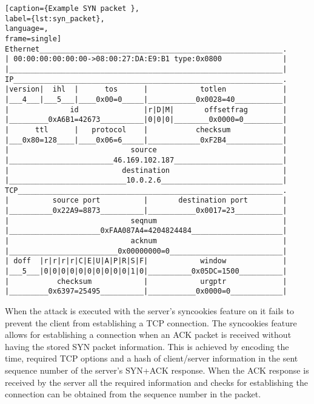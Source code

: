 \begin{minipage}{\linewidth}
\begin{lstlisting}[caption={Example SYN packet },
label={lst:syn_packet},
language=,
frame=single]
Ethernet________________________________________________________.
| 00:00:00:00:00:00->08:00:27:DA:E9:B1 type:0x0800              |
|_______________________________________________________________|
IP______________________________________________________________.
|version|  ihl  |      tos      |            totlen             |
|___4___|___5___|____0x00=0_____|___________0x0028=40___________|
|              id               |r|D|M|       offsetfrag        |
|_________0xA6B1=42673__________|0|0|0|________0x0000=0_________|
|      ttl      |   protocol    |           checksum            |
|___0x80=128____|____0x06=6_____|____________0xF2B4_____________|
|                            source                             |
|________________________46.169.102.187_________________________|
|                          destination                          |
|___________________________10.0.2.6____________________________|
TCP_____________________________________________________________.
|          source port          |       destination port        |
|__________0x22A9=8873__________|___________0x0017=23___________|
|                            seqnum                             |
|_____________________0xFAA087A4=4204824484_____________________|
|                            acknum                             |
|_________________________0x00000000=0__________________________|
| doff  |r|r|r|r|C|E|U|A|P|R|S|F|            window             |
|___5___|0|0|0|0|0|0|0|0|0|0|1|0|__________0x05DC=1500__________|
|           checksum            |            urgptr             |
|_________0x6397=25495__________|___________0x0000=0____________|
\end{lstlisting}
\end{minipage}
When the attack is executed with the server's syncookies feature on it fails to prevent the client from establishing a TCP connection. The syncookies feature allows for establishing a connection when an ACK packet is received without having the stored SYN packet information. This is achieved by encoding the time, required TCP options and a hash of client/server information in the sent sequence number of the server's SYN+ACK response. When the ACK response is received by the server all the required information and checks for establishing the connection can be obtained from the sequence number in the packet. \\
